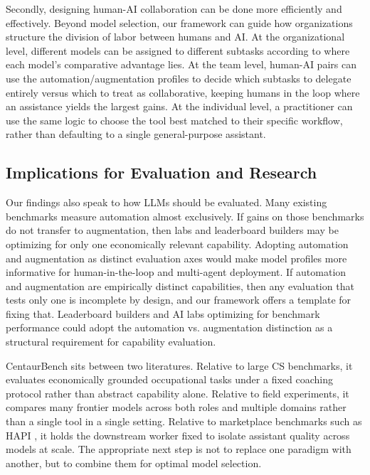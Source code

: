 Secondly, designing human-AI collaboration can be done more efficiently and effectively. Beyond model selection, our framework can guide how organizations structure the division of labor between humans and AI. At the organizational level, different models can be assigned to different subtasks according to where each model's comparative advantage lies. At the team level, human-AI pairs can use the automation/augmentation profiles to decide which subtasks to delegate entirely versus which to treat as collaborative, keeping humans in the loop where an assistance yields the largest gains. At the individual level, a practitioner can use the same logic to choose the tool best matched to their specific workflow, rather than defaulting to a single general-purpose assistant.

\subsection{Implications for Evaluation and Research}

Our findings also speak to how LLMs should be evaluated. Many existing benchmarks measure automation almost exclusively. If gains on those benchmarks do not transfer to augmentation, then labs and leaderboard builders may be optimizing for only one economically relevant capability. Adopting automation and augmentation as distinct evaluation axes would make model profiles more informative for human-in-the-loop and multi-agent deployment. If automation and augmentation are empirically distinct capabilities, then any evaluation that tests only one is incomplete by design, and our framework offers a template for fixing that. Leaderboard builders and AI labs optimizing for benchmark performance could adopt the automation vs. augmentation distinction as a structural requirement for capability evaluation.
    
CentaurBench sits between two literatures. Relative to large CS benchmarks, it evaluates economically grounded occupational tasks under a fixed coaching protocol rather than abstract capability alone. Relative to field experiments, it compares many frontier models across both roles and multiple domains rather than a single tool in a single setting. Relative to marketplace benchmarks such as HAPI \citep{upwork_hapi2025}, it holds the downstream worker fixed to isolate assistant quality across models at scale. The appropriate next step is not to replace one paradigm with another, but to combine them for optimal model selection. 

